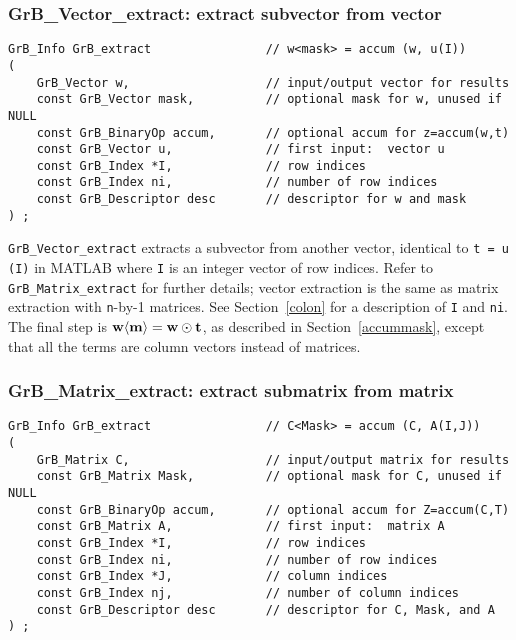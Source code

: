 \documentclass[12pt]{article}
\begin{document}
{%
\subsubsection{{\sf GrB\_Vector\_extract:} extract subvector from vector}
\label{extract_vector}

\begin{mdframed}[userdefinedwidth=6in]
{\footnotesize
\begin{verbatim}
GrB_Info GrB_extract                // w<mask> = accum (w, u(I))
(
    GrB_Vector w,                   // input/output vector for results
    const GrB_Vector mask,          // optional mask for w, unused if NULL
    const GrB_BinaryOp accum,       // optional accum for z=accum(w,t)
    const GrB_Vector u,             // first input:  vector u
    const GrB_Index *I,             // row indices
    const GrB_Index ni,             // number of row indices
    const GrB_Descriptor desc       // descriptor for w and mask
) ;
\end{verbatim} } \end{mdframed}

\verb'GrB_Vector_extract' extracts a subvector from another vector, identical
to \verb't = u (I)' in MATLAB where \verb'I' is an integer vector of row
indices.  Refer to \verb'GrB_Matrix_extract' for further details; vector
extraction is the same as matrix extraction with \verb'n'-by-1 matrices.
See Section~\ref{colon} for a description of \verb'I' and \verb'ni'.
The final step is ${\bf w \langle m \rangle  = w \odot
t}$, as described in Section~\ref{accummask}, except that all the terms are
column vectors instead of matrices.

\newpage
\subsubsection{{\sf GrB\_Matrix\_extract:} extract submatrix from matrix}
\label{extract_matrix}

\begin{mdframed}[userdefinedwidth=6in]
{\footnotesize
\begin{verbatim}
GrB_Info GrB_extract                // C<Mask> = accum (C, A(I,J))
(
    GrB_Matrix C,                   // input/output matrix for results
    const GrB_Matrix Mask,          // optional mask for C, unused if NULL
    const GrB_BinaryOp accum,       // optional accum for Z=accum(C,T)
    const GrB_Matrix A,             // first input:  matrix A
    const GrB_Index *I,             // row indices
    const GrB_Index ni,             // number of row indices
    const GrB_Index *J,             // column indices
    const GrB_Index nj,             // number of column indices
    const GrB_Descriptor desc       // descriptor for C, Mask, and A
) ;
\end{verbatim} } \end{mdframed}

}
\end{document}
